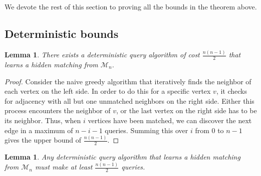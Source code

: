 \documentclass[11pt]{article}
\newcommand{\cM}{\mathcal{M}}
\newtheorem{lemma}[theorem]{Lemma}
\begin{document}
\mainResultMatching*

We devote the rest of this section to proving all the bounds in the theorem above.

\subsection{Deterministic bounds}
\begin{lemma}\label{lem:matchingub-det}
    There exists a deterministic query algorithm of cost $\frac{n(n-1)}{2}$ that learns a hidden matching from $\cM_n$.
\end{lemma}

\begin{proof}
    Consider the naive greedy algorithm that iteratively finds the neighbor of each vertex on the left side.
    In order to do this for a specific vertex $v$, it checks for adjacency with all but one unmatched neighbors on the right side. Either this process encounters the neighbor of $v$, or the last vertex on the right side has to be its neighbor. Thus, when $i$ vertices have been matched, we can discover the next edge in a maximum of $n - i - 1$ queries. Summing this over $i$ from $0$ to $n-1$ gives the upper bound of $\frac{n(n-1)}{2}$.
\end{proof}

\begin{lemma}\label{lem:matchinglb-det}
    Any deterministic query algorithm that learns a hidden matching from $\cM_n$ must make at least $\frac{n(n-1)}{2}$ queries.
\end{lemma}
\end{document}
